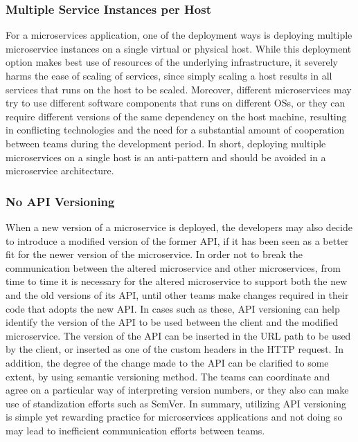 \documentclass{Configuration_Files/PoliMi3i_thesis}
\begin{document}
\subsubsection{Multiple Service Instances per Host}
\label{subsubsec:multiple_service_per_host}

For a microservices application, one of the deployment ways is deploying multiple microservice instances on a single virtual or physical host.
While this deployment option makes best use of resources of the underlying infrastructure, it severely harms the ease of scaling of services, since simply scaling a host results in all services that runs on the host to be scaled.
Moreover, different microservices may try to use different software components that runs on different OSs, or they can require different versions of the same dependency on the host machine, resulting in conflicting technologies and the need for a substantial amount of cooperation between teams during the development period.
In short, deploying multiple microservices on a single host is an anti-pattern and should be avoided in a microservice architecture.

\subsubsection{No API Versioning}
\label{subsubsec:no_api_versioning}

When a new version of a microservice is deployed, the developers may also decide to introduce a modified version of the former API, if it has been seen as a better fit for the newer version of the microservice.
In order not to break the communication between the altered microservice and other microservices, from time to time it is necessary for the altered microservice to support both the new and the old versions of its API, until other teams make changes required in their code that adopts the new API.
In cases such as these, API versioning can help identify the version of the API to be used between the client and the modified microservice.
The version of the API can be inserted in the URL path to be used by the client, or inserted as one of the custom headers in the HTTP request.
In addition, the degree of the change made to the API can be clarified to some extent, by using semantic versioning method.
The teams can coordinate and agree on a particular way of interpreting version numbers, or they also can make use of standization efforts such as SemVer.
In summary, utilizing API versioning is simple yet rewarding practice for microservices applications and not doing so may lead to inefficient communication efforts between teams.
\end{document}
